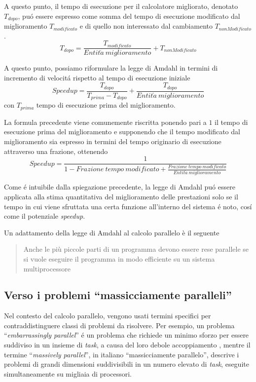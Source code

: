 A questo punto, il tempo di esecuzione per il calcolatore migliorato, denotato $T_{dopo}$, pu\'o essere espresso come somma
del tempo di esecuzione modificato dal miglioramento $T_{modificato}$ e di quello non interessato dal cambiamento
$T_{nonModificato}$.
\[
    T_{dopo}=\frac{T_{modificato}}{Entit\grave{a}~miglioramento} + T_{nonModificato}
\]

A questo punto, possiamo riformulare la legge di Amdahl in termini di incremento di velocit\'a rispetto al tempo di esecuzione iniziale
\[
    \mathit{Speedup}=\frac{T_{dopo}}{T_{prima}-T_{dopo}}+\frac{T_{dopo}}{Entit\grave{a}~miglioramento}
\]
con $T_{prima}$ tempo di esecuzione prima del miglioramento.

La formula precedente viene comunemente riscritta ponendo pari a $1$ il tempo di esecuzione prima del miglioramento e supponendo che
il tempo modificato dal miglioramento sia espresso in termini del tempo originario di esecuzione attraverso una frazione, ottenendo
\[
    \mathit{Speedup} = \frac{1}{1 - \mathit{Frazione~tempo~modificato} + \frac{\mathit{Frazione~tempo~modificato}}{\mathit{Entit\grave{a}~miglioramento}}}
\]

Come \'e intuibile dalla spiegazione precedente, la legge di Amdahl pu\'o essere applicata alla stima quantitativa del miglioramento delle
prestazioni solo se il tempo in cui viene sfruttata una certa funzione all'interno del sistema \'e noto, cos\'i come il
potenziale \textit{speedup}.

Un adattamento della legge di Amdahl al calcolo parallelo è il seguente

\blockquote{Anche le più piccole parti di un programma devono essere rese parallele se si vuole eseguire il programma in modo efficiente su un sistema multiprocessore}

\subsection{Verso i problemi \enquote{massicciamente paralleli}}
Nel contesto del calcolo parallelo, vengono usati termini specifici per contraddistinguere classi di problemi da risolvere.\newline
Per esempio, un problema \enquote{\textit{embarrassingly parallel}} \'e un problema che richiede un minimo sforzo per essere suddiviso in un insieme di
\textit{task}, a causa del loro debole accoppiamento \cite{Herlihy2012}, mentre il termine \enquote{\textit{massively parallel}}, in italiano \enquote{massicciamente parallelo}, 
descrive i problemi di grandi dimensioni suddivisibili in un numero elevato di \textit{task}, eseguite simultaneamente su migliaia di processori.

